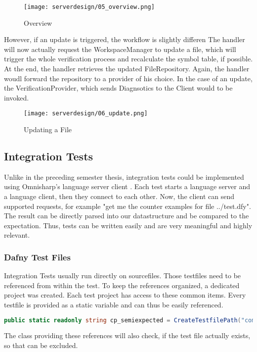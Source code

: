 \begin{figure}[H]
    \centering
    \texttt{[image: serverdesign/05\_overview.png]}
    \caption{Overview}
    \label{fig:server_overview}
\end{figure}


However, if an update is triggered, the workflow is slightly differen
 The handler will now actually request the WorkspaceManager to update a file, which will trigger the whole verification process and recalculate the symbol table, if possible.
 At the end, the handler retrieves the updated FileRepository.
 Again, the handler woudl forward the repository to a provider of his choice.
 In the case of an update, the VerificationProvider, which sends Diagnsotics to the Client would to be invoked.

\begin{figure}[H]
    \centering
    \texttt{[image: serverdesign/06\_update.png]}
    \caption{Updating a File}
    \label{fig:server_update}
\end{figure}


\subsection{Integration Tests}
\label{chapter:designTests}
Unlike in the preceding semester thesis, integration tests could be implemented using Omnisharp's language server client \cite{omnisharpClient}. Each test starts a language server and a language client, then they connect to each other. Now, the client can send supported requests, for example "get me the counter examples for file ../test.dfy". The result can be directly parsed into our  datastructure and be compared to the expectation. Thus, tests can be written easily and are very meaningful and highly relevant.

\subsubsection{Dafny Test Files}
Integration Tests usually run directly on  sourcefiles. Those testfiles need to be referenced from within the test. To keep the references organized, a dedicated project  was created. Each test project has access to these common items. Every testfile is provided as a static variable and can thus be easily referenced.

\begin{lstlisting}[language=csharp, caption={Test File Reference}, captionpos=b, label={lst:semiExpectedCodeThing}]
public static readonly string cp_semiexpected = CreateTestfilePath("compile/semi_expected_error.dfy");
\end{lstlisting}
The class providing these references will also check, if the test file actually exists, so that  can be excluded.

